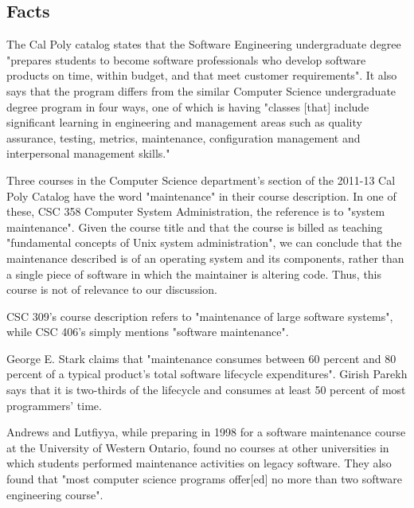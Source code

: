 \documentclass[11pt]{article}
\begin{document}
\begin{multicols}{2}
\setcounter{page}{1}
\section{Facts}

The Cal Poly catalog states that the Software Engineering undergraduate degree "prepares students to become software professionals who develop software 
products on time, within budget, and that meet customer requirements". \cite{catalogDept}  It also says that the program differs from the similar Computer Science undergraduate degree program in four ways, one of which is having "classes [that] include significant learning in engineering and management areas such as quality assurance, testing, metrics, maintenance, configuration management and interpersonal management skills." \cite{catalogDept}

Three courses in the Computer Science department's section of the 2011-13 Cal Poly Catalog have the word "maintenance" in their course description. \cite{catalogCourses}  In one of these, CSC 358 Computer System Administration, the reference is to "system maintenance". \cite{catalogCourses}  Given the course title and that the course is billed as teaching "fundamental concepts of Unix system administration", \cite{catalogCourses} we can conclude that the maintenance described is of an operating system and its components, rather than a single piece of software in which the maintainer is altering code.  Thus, this course is not of relevance to our discussion.

CSC 309's course description refers to "maintenance of large software systems", while CSC 406's simply mentions "software maintenance". \cite{catalogCourses}

George E. Stark claims that "maintenance consumes between 60 percent and 80 percent of a typical product's total software lifecycle expenditures". \cite{stark97}  Girish Parekh says that it is two-thirds of the lifecycle and consumes at least 50 percent of most programmers' time. \cite{parekh}

Andrews and Lutfiyya, while preparing in 1998 for a software maintenance course at the University of Western Ontario, found no courses at other universities in which students performed maintenance activities on legacy software. \cite{Andrews:2000:ERS:794188.794320} They also found that "most computer science programs offer[ed] no more than two software engineering course". \cite{Andrews:2000:ERS:794188.794320}


\end{multicols}
\end{document}
